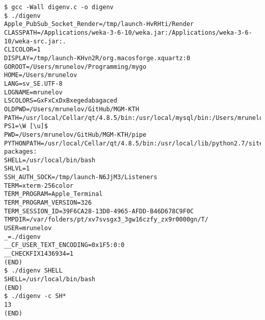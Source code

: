 \documentclass[paper=a4, fontsize=11pt]{scrartcl} %
\numberwithin{equation}{section} %
\numberwithin{figure}{section} %
\numberwithin{table}{section} %
\begin{document}
\begin{verbatim}
$ gcc -Wall digenv.c -o digenv
$ ./digenv 
Apple_PubSub_Socket_Render=/tmp/launch-HvRHti/Render
CLASSPATH=/Applications/weka-3-6-10/weka.jar:/Applications/weka-3-6-10/weka-src.jar:.
CLICOLOR=1
DISPLAY=/tmp/launch-KHvn2R/org.macosforge.xquartz:0
GOROOT=/Users/mrunelov/Programming/mygo
HOME=/Users/mrunelov
LANG=sv_SE.UTF-8
LOGNAME=mrunelov
LSCOLORS=GxFxCxDxBxegedabagaced
OLDPWD=/Users/mrunelov/GitHub/MGM-KTH
PATH=/usr/local/Cellar/qt/4.8.5/bin:/usr/local/mysql/bin:/Users/mrunelov/scripts:/opt/local/bin:/opt/local/sbin:/usr/local/bin:/usr/local/google_appengine:/usr/local:/Library/Frameworks/Python.framework/Versions/2.7/bin:/usr/local/bin:/usr/bin:/bin:/usr/sbin:/sbin:/opt/X11/bin:/usr/local/go/bin:/usr/texbin:/Users/mrunelov/Programming/mygo/bin:/usr/local/go/bin
PS1=\W [\u]$ 
PWD=/Users/mrunelov/GitHub/MGM-KTH/pipe
PYTHONPATH=/usr/local/Cellar/qt/4.8.5/bin:/usr/local/lib/python2.7/site-packages:
SHELL=/usr/local/bin/bash
SHLVL=1
SSH_AUTH_SOCK=/tmp/launch-N6JjM3/Listeners
TERM=xterm-256color
TERM_PROGRAM=Apple_Terminal
TERM_PROGRAM_VERSION=326
TERM_SESSION_ID=39F6CA28-13D0-4965-AFDD-B46D678C9F0C
TMPDIR=/var/folders/pt/xv7svsgx3_3gw16czfy_zx9r0000gn/T/
USER=mrunelov
_=./digenv
__CF_USER_TEXT_ENCODING=0x1F5:0:0
__CHECKFIX1436934=1
(END) 
$ ./digenv SHELL
SHELL=/usr/local/bin/bash
(END) 
$ ./digenv -c SH*
13
(END)
\end{verbatim}

\end{document}

